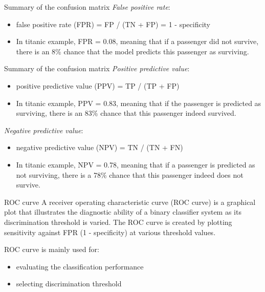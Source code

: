\documentclass[10pt]{beamer}\usepackage[]{graphicx}\usepackage[]{xcolor}
\begin{document}

\begin{frame}[fragile]{Summary of the confusion matrix}
\emph{False positive rate}:
\begin{itemize}
\item false positive rate (FPR) = FP / (TN + FP) = 1 - specificity
\item In titanic example, FPR = 0.08, meaning that if a passenger did not survive, there is an 8\% chance that the model predicts this passenger as surviving. 
\end{itemize}
\end{frame}


\begin{frame}[fragile]{Summary of the confusion matrix}
\emph{Positive predictive value}:
\begin{itemize}
\item positive predictive value (PPV) = TP / (TP + FP)
\item In titanic example, PPV = 0.83, meaning that if the passenger is predicted as surviving, there is an 83\% chance that this passenger indeed survived. 
\end{itemize}
\va
\emph{Negative predictive value}:
\begin{itemize}
\item negative predictive value (NPV) = TN / (TN + FN)
\item In titanic example, NPV = 0.78, meaning that if a passenger is predicted as not surviving, there is a 78\% chance that this passenger indeed does not survive.  
\end{itemize}
\end{frame}


\begin{frame}[fragile]{ROC curve}
A receiver operating characteristic curve (ROC curve) is a graphical plot that illustrates the diagnostic ability of a binary classifier system as its discrimination threshold is varied. The ROC curve is created by plotting sensitivity against FPR (1 - specificity) at various threshold values. 
\va

ROC curve is mainly used for:
\begin{itemize}
\item evaluating the classification performance
\item selecting discrimination threshold
\end{itemize}

\end{frame}
\end{document}
